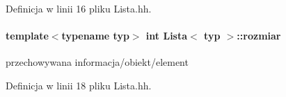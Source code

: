 Definicja w linii 16 pliku Lista.\+hh.

\hypertarget{class_lista_a5b9d349b6ba27b55058ca77cb0909b6e}{}
\paragraph[{rozmiar}]{\setlength{\rightskip}{0pt plus 5cm}template$<$typename typ$>$ int {\bf Lista}$<$ typ $>$\+::rozmiar\hspace{0.3cm}{\ttfamily [private]}}\label{class_lista_a5b9d349b6ba27b55058ca77cb0909b6e}
przechowywana informacja/obiekt/element 

Definicja w linii 18 pliku Lista.\+hh.

